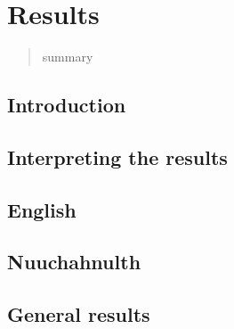 \chapter{Results}
\label{ch:results}

\blockquote{summary}

\section{Introduction}
\label{sec:4.1}

\section{Interpreting the results}
\label{sec:4.2}

\section{English}
\label{sec:4.3}

\section{Nuuchahnulth}
\label{sec:4.4}

\section{General results}
\label{sec:4.5}
